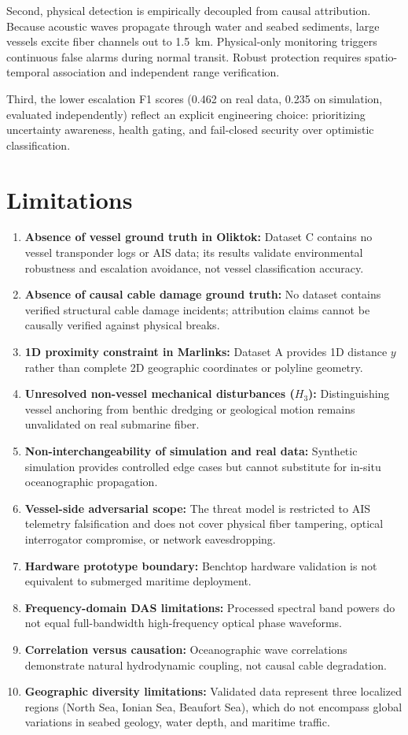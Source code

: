 \documentclass[conference]{IEEEtran}
\begin{document}
Second, physical detection is empirically decoupled from causal attribution.
Because acoustic waves propagate through water and seabed sediments, large
vessels excite fiber channels out to 1.5~km. Physical-only monitoring triggers
continuous false alarms during normal transit. Robust protection requires
spatio-temporal association and independent range verification.

Third, the lower escalation F1 scores (0.462 on real data, 0.235 on simulation,
evaluated independently) reflect an explicit engineering choice: prioritizing
uncertainty awareness, health gating, and fail-closed security over optimistic
classification.

\section{Limitations}
\label{sec:limitations}

\begin{enumerate}
\item \textbf{Absence of vessel ground truth in Oliktok:} Dataset C contains no
vessel transponder logs or AIS data; its results validate environmental
robustness and escalation avoidance, not vessel classification accuracy.
\item \textbf{Absence of causal cable damage ground truth:} No dataset
contains verified structural cable damage incidents; attribution claims cannot
be causally verified against physical breaks.
\item \textbf{1D proximity constraint in Marlinks:} Dataset A provides 1D
distance $y$ rather than complete 2D geographic coordinates or polyline geometry.
\item \textbf{Unresolved non-vessel mechanical disturbances ($H_3$):}
Distinguishing vessel anchoring from benthic dredging or geological motion
remains unvalidated on real submarine fiber.
\item \textbf{Non-interchangeability of simulation and real data:} Synthetic
simulation provides controlled edge cases but cannot substitute for in-situ
oceanographic propagation.
\item \textbf{Vessel-side adversarial scope:} The threat model is restricted to
AIS telemetry falsification and does not cover physical fiber tampering, optical
interrogator compromise, or network eavesdropping.
\item \textbf{Hardware prototype boundary:} Benchtop hardware validation is not
equivalent to submerged maritime deployment.
\item \textbf{Frequency-domain DAS limitations:} Processed spectral band powers
do not equal full-bandwidth high-frequency optical phase waveforms.
\item \textbf{Correlation versus causation:} Oceanographic wave correlations
demonstrate natural hydrodynamic coupling, not causal cable degradation.
\item \textbf{Geographic diversity limitations:} Validated data represent
three localized regions (North Sea, Ionian Sea, Beaufort Sea), which do not
encompass global variations in seabed geology, water depth, and maritime traffic.
\end{enumerate}
\end{document}
